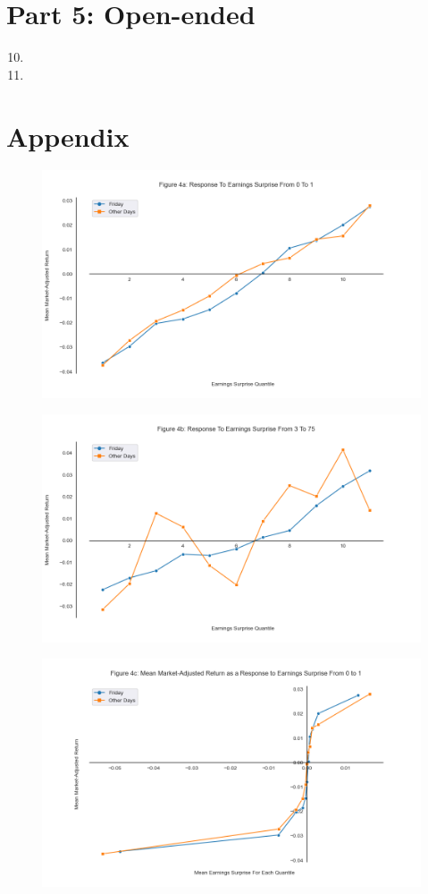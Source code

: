 \documentclass[11pt]{article}
\begin{document}
\section{Part 5: Open-ended}

\begin{enumerate}
\setcounter{enumi}{9}
\renewcommand{\labelenumi}{(\theenumi)}
    \item 

    \item

\end{enumerate}

\section{Appendix}
\begin{figure}[H] 
    \centering
    \includegraphics[width=.8\textwidth]{fig4a.png}
\end{figure}

\begin{figure}[H] 
    \centering
    \includegraphics[width=.8\textwidth]{fig4b.png}
\end{figure}

\begin{figure}[H] 
    \centering
    \includegraphics[width=.8\textwidth]{fig4c.png}
\end{figure}
\end{document}
